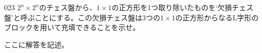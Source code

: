 \begin{prob}{023}{}{}
 $2^n\times2^n$のチェス盤から、$1\times1$の正方形を1つ取り除いたものを`欠損チェス盤'と呼ぶことにする。この欠損チェス盤は3つの$1\times1$の正方形からなるL字形のブロックを用いて充填できることを示せ。
\end{prob}
ここに解答を記述。